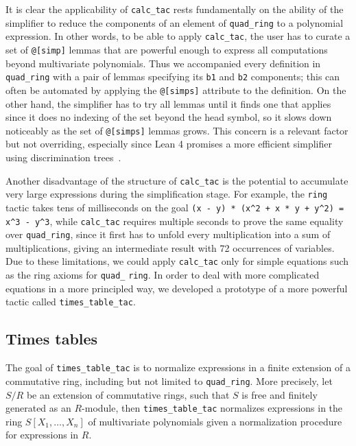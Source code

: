 \documentclass[sigplan,10pt,nonacm,
screen]{acmart} \settopmatter{printfolios=true,printccs=false,printacmref=false}
\begin{document}
It is clear the applicability of \lstinline{calc_tac} rests fundamentally on the ability of the simplifier to reduce the components of an element of \lstinline{quad_ring} to a polynomial expression.
In other words, to be able to apply \lstinline{calc_tac}, the user has to curate a set of \lstinline{@[simp]} lemmas that are powerful enough to express all computations beyond multivariate polynomials.
Thus we accompanied every definition in \lstinline{quad_ring} with a pair of lemmas specifying its \lstinline{b1} and \lstinline{b2} components;
this can often be automated by applying the \lstinline{@[simps]} attribute to the definition.
On the other hand, the simplifier has to try all lemmas until it finds one that applies since it does no indexing of the set beyond the head symbol, so it slows down noticeably as the set of \lstinline{@[simps]} lemmas grows.
This concern is a relevant factor but not overriding, especially since Lean 4 promises a more efficient simplifier using discrimination trees~\cite{lean-4}.

Another disadvantage of the structure of \lstinline{calc_tac} is the potential to accumulate very large expressions during the simplification stage.
For example, the \lstinline{ring} tactic takes tens of milliseconds on the goal \lstinline{(x - y) * (x^2 + x * y + y^2) = x^3 - y^3},
while \lstinline{calc_tac} requires multiple seconds to prove the same equality over \lstinline{quad_ring},
since it first has to unfold every multiplication into a sum of multiplications, giving an intermediate result with 72 occurrences of variables.
Due to these limitations, we could apply \lstinline{calc_tac} only for simple equations such as the ring axioms for \lstinline{quad_}\- %
\lstinline{ring}.
In order to deal with more complicated equations in a more principled way, we developed a prototype of a more powerful tactic called \lstinline{times_table_tac}.

\subsection{Times tables}

The goal of \lstinline{times_table_tac} is to normalize expressions in a finite extension of a commutative ring, including but not limited to \lstinline{quad_ring}.
More precisely, let $S/R$ be an extension of commutative rings, such that $S$ is free and finitely generated as an $R$-module,
then \lstinline{times_table_tac} normalizes expressions in the ring $S[X_1, \dots, X_n]$ of multivariate polynomials given a normalization procedure for expressions in $R$.
\end{document}
